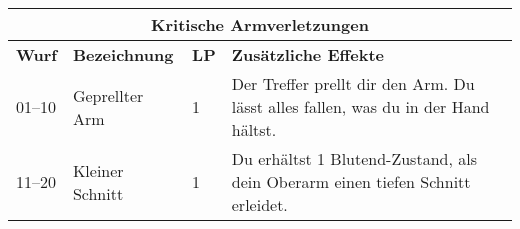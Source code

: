 \documentclass[a4paper, fontsize=8.5pt]{scrartcl}
\begin{document}
\begin{table}[!ht]
    \centering
    \begin{tabularx}{\textwidth}{lp{2.5cm}lX}
        \multicolumn{4}{c}{\cellcolor{gray!25} \textbf{Kritische Armverletzungen}}                                                                                                                                                                                                                                                                                                                                                                                                                                                                                                                                                                                                                                            \\ \hline
        \textbf{Wurf} & \textbf{Bezeichnung}       & \textbf{LP} & \textbf{Zusätzliche Effekte}                                                                                                                                                                                                                                                                                                                                                                                                                                                                                                                                                                                                                               \\ \hline
        01–10         & Geprellter Arm             & 1           & Der Treffer prellt dir den Arm. Du lässt alles fallen, was du in der Hand hältst.                                                                                                                                                                                                                                                                                                                                                                                                                                                                                                                                                                          \\ \hline
        11–20         & Kleiner Schnitt            & 1           & Du erhältst 1 Blutend-Zustand, als dein Oberarm einen tiefen Schnitt erleidet.                                                                                                                                                                                                                                                                                                                                                                                                                                                                                                                                                                             \\ \hline

\end{tabularx}
\end{table}
\end{document}

